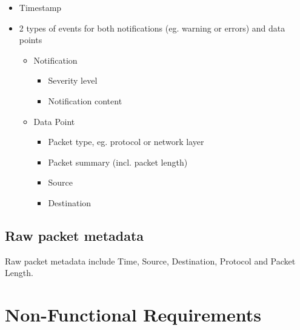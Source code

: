 \documentclass[twoside, english, draft]{Pflichtenheft}
\begin{document}
	\begin{itemize}
		\item Timestamp
		\item 2 types of events for both notifications (eg. warning or errors) and data points
			\begin{itemize}
				\item Notification
				\begin{itemize}
					\item Severity level
					\item Notification content
				\end{itemize}
				\item Data Point
				\begin{itemize}
					\item Packet type, eg. protocol or network layer
					\item Packet summary (incl. packet length)
					\item Source
					\item Destination
				\end{itemize}
			\end{itemize}
	\end{itemize}

\subsection{Raw packet metadata}
\begin{description}
    \item
	Raw packet metadata include Time, Source, Destination, Protocol and Packet Length.
\end{description}

\section{Non-Functional Requirements}
\end{document}

